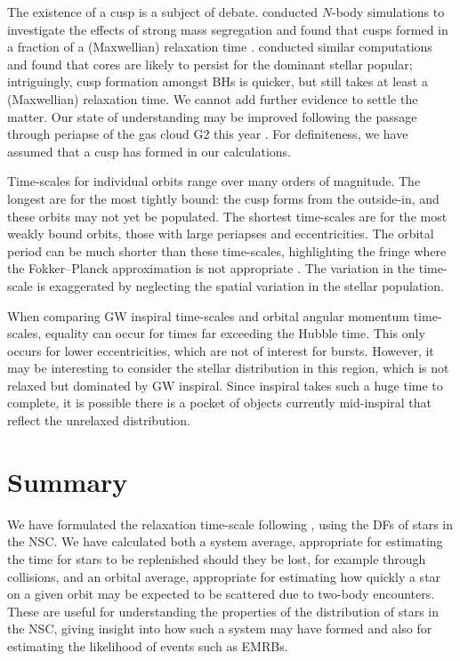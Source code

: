 The existence of a cusp is a subject of debate. \citet{Preto2010} conducted $N$-body simulations to investigate the effects of strong mass segregation \citep{Alexander2009, Keshet2009} and found that cusps formed in a fraction of a (Maxwellian) relaxation time \citep{Amaro-Seoane2011d}. \citet{Gualandris2012} conducted similar computations and found that cores are likely to persist for the dominant stellar popular; intriguingly, cusp formation amongst BHs is quicker, but still takes at least a (Maxwellian) relaxation time. We cannot add further evidence to settle the matter. Our state of understanding may be improved following the passage through periapse of the gas cloud G2 this year \citep{Bartos2013}. For definiteness, we have assumed that a cusp has formed in our calculations.

Time-scales for individual orbits range over many orders of magnitude. The longest are for the most tightly bound: the cusp forms from the outside-in, and these orbits may not yet be populated. The shortest time-scales are for the most weakly bound orbits, those with large periapses and eccentricities. The orbital period can be much shorter than these time-scales, highlighting the fringe where the Fokker--Planck approximation is not appropriate \citep{Spitzer1972Jr}. The variation in the time-scale is exaggerated by neglecting the spatial variation in the stellar population.

When comparing GW inspiral time-scales and orbital angular momentum time-scales, equality can occur for times far exceeding the Hubble time. This only occurs for lower eccentricities, which are not of interest for bursts. However, it may be interesting to consider the stellar distribution in this region, which is not relaxed but dominated by GW inspiral. Since inspiral takes such a huge time to complete, it is possible there is a pocket of objects currently mid-inspiral that reflect the unrelaxed distribution.

\section{Summary}

We have formulated the relaxation time-scale following \citet{Chandrasekhar1960}, using the DFs of stars in the NSC. We have calculated both a system average, appropriate for estimating the time for stars to be replenished should they be lost, for example through collisions, and an orbital average, appropriate for estimating how quickly a star on a given orbit may be expected to be scattered due to two-body encounters. These are useful for understanding the properties of the distribution of stars in the NSC, giving insight into how such a system may have formed and also for estimating the likelihood of events such as EMRBs.

